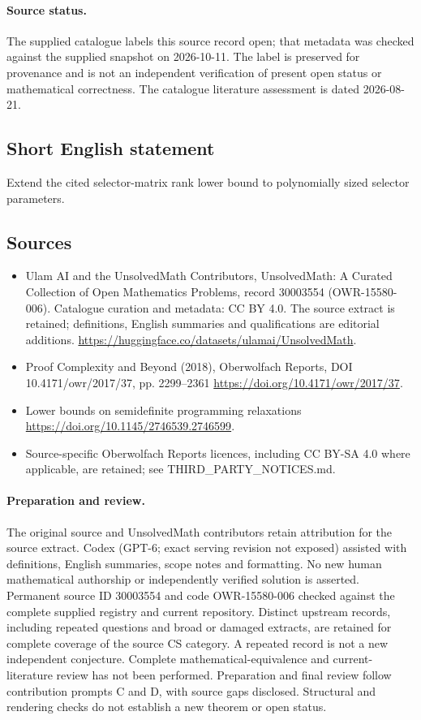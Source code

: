 \documentclass[11pt]{article}
\begin{document}
\paragraph{Source status.}
The supplied catalogue labels this source record open; that metadata was checked against the supplied snapshot on 2026-10-11. The label is preserved for provenance and is not an independent verification of present open status or mathematical correctness. The catalogue literature assessment is dated 2026-08-21.
\subsection{Short English statement}
Extend the cited selector-matrix rank lower bound to polynomially sized selector parameters.
\subsection{Sources}
\begin{itemize}
\item[S1] Ulam AI and the UnsolvedMath Contributors, UnsolvedMath: A Curated Collection of Open Mathematics Problems, record 30003554 (OWR-15580-006). Catalogue curation and metadata: CC BY 4.0. The source extract is retained; definitions, English summaries and qualifications are editorial additions.
\url{https://huggingface.co/datasets/ulamai/UnsolvedMath}.
\item[S2] Proof Complexity and Beyond (2018), Oberwolfach Reports, DOI 10.4171/owr/2017/37, pp. 2299--2361
\url{https://doi.org/10.4171/owr/2017/37}.
\item[S3] Lower bounds on semidefinite programming relaxations
\url{https://doi.org/10.1145/2746539.2746599}.
\item Source-specific Oberwolfach Reports licences, including CC BY-SA 4.0 where applicable, are retained; see THIRD\_PARTY\_NOTICES.md.
\end{itemize}
\paragraph{Preparation and review.}
The original source and UnsolvedMath contributors retain attribution for the source extract. Codex (GPT-6; exact serving revision not exposed) assisted with definitions, English summaries, scope notes and formatting. No new human mathematical authorship or independently verified solution is asserted. Permanent source ID 30003554 and code OWR-15580-006 checked against the complete supplied registry and current repository. Distinct upstream records, including repeated questions and broad or damaged extracts, are retained for complete coverage of the source CS category. A repeated record is not a new independent conjecture. Complete mathematical-equivalence and current-literature review has not been performed. Preparation and final review follow contribution prompts C and D, with source gaps disclosed. Structural and rendering checks do not establish a new theorem or open status.
\label{end:30003554}
\end{document}
